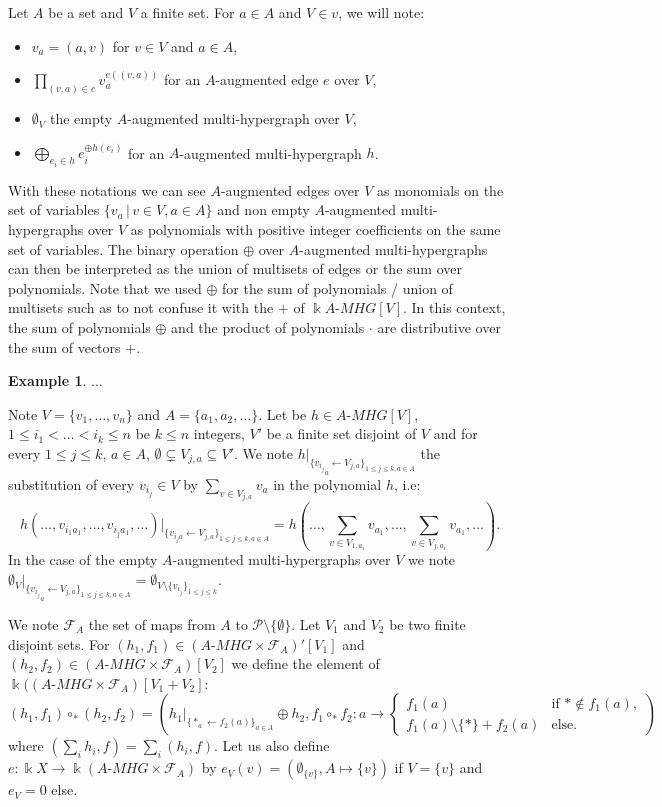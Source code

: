 \documentclass[a4paper]{article}
\theoremstyle{definition}
\newtheorem{example}[definition]{Example}
\begin{document}
Let $A$ be a set and $V$ a finite set. For $a\in A$ and $V\in v$, we will note:
\begin{itemize}
\item $v_a = (a,v)$ for $v\in V$ and $a\in A$,
\item $\prod_{(v,a)\in e} v_a^{e((v,a))}$ for an $A$-augmented edge $e$ over $V$,
\item $\emptyset_V$ the empty $A$-augmented multi-hypergraph over $V$,
\item $\bigoplus_{e_i\in h}e_i^{\oplus h(e_i)}$ for an $A$-augmented multi-hypergraph $h$.
\end{itemize}
With these notations we can see $A$-augmented edges over $V$ as monomials on the set of variables $\{v_a\,|\, v\in V,  a\in A\}$ and non empty $A$-augmented multi-hypergraphs over $V$ as polynomials with positive integer coefficients on the same set of variables. The binary operation $\oplus$ over $A$-augmented multi-hypergraphs can then be interpreted as the union of multisets of edges or the sum over polynomials. Note that we used $\oplus$ for the sum of polynomials / union of multisets such as to not confuse it with the $+$ of $\Bbbk A\text{-}MHG[V]$. In this context, the sum of polynomials $\oplus$ and the product of polynomials $\cdot$ are distributive over the sum of vectors $+$.

\begin{example}
...
\end{example}

Note $V = \{v_1,\dots, v_n\}$ and $A=\{a_1, a_2, \dots\}$. Let be $h\in A\text{-}MHG[V]$, $1\leq i_1 <\dots < i_k\leq n$ be $k\leq n$ integers, $V'$ be a finite set disjoint of $V$ and for every $1\leq j\leq k$, $a\in A$, $\emptyset\subsetneq V_{j,a} \subseteq V'$. We note $h|_{\{ {v_{i_j}}_a \leftarrow V_{j,a}\}_{1\leq j\leq k, a\in A}}$ the substitution of every $v_{i_j}\in V$ by $\sum_{v\in V_{j,a}} v_a$ in the polynomial $h$, i.e: $$h(\dots, v_{i_1a_1},\dots, v_{i_ja_1},\dots)|_{\{ v_{i_ja} \leftarrow V_{j,a}\}_{1\leq j\leq k, a\in A}} = h(\dots, \sum_{v\in V_{1,a_1}} v_{a_1}, \dots, \sum_{v\in V_{j,a_1}} v_{a_1}, \dots).$$
In the case of the empty $A$-augmented multi-hypergraphs over $V$ we note $\emptyset_V|_{\{ {v_{i_j}}_a \leftarrow V_{j,a}\}_{1\leq j\leq k, a\in A}} = \emptyset_{V\setminus\{v_{i_j}\}_{1\leq j\leq k}}$.

We note $\mathcal{F}_A$ the set of maps from $A$ to $\mathcal{P}\setminus\{\emptyset\}$.
Let $V_1$ and $V_2$ be two finite disjoint sets. For $(h_1,f_1)\in (A\text{-}MHG\times \mathcal{F}_A)'[V_1]$ and  $(h_2,f_2)\in (A\text{-}MHG\times \mathcal{F}_A)[V_2]$ we define the element of $\Bbbk((A\text{-}MHG\times\mathcal{F}_A)[V_1+V_2]$:
$$ (h_1,f_1)\circ_{\ast}(h_2,f_2) = \left(h_1|_{\{\ast_a\leftarrow f_2(a)\}_{a\in A}}\oplus h_2, f_1\circ_\ast f_2: a\rightarrow\left\{\begin{array}{cl}
f_1(a)  & \text{if $\ast\not\in f_1(a)$},    \\ 
f_1(a)\setminus\{\ast\} + f_2(a)  & \text{else.}\end{array}\right.\right)$$
where $(\sum_i h_i, f) = \sum_i(h_i,f)$.
Let us also define $e:\Bbbk X \rightarrow \Bbbk (A\text{-}MHG\times \mathcal{F}_A)$ by $e_{V}(v) = (\emptyset_{\{v\}},A\mapsto\{v\})$ if $V=\{v\}$ and $e_V = 0$ else.
\end{document}
